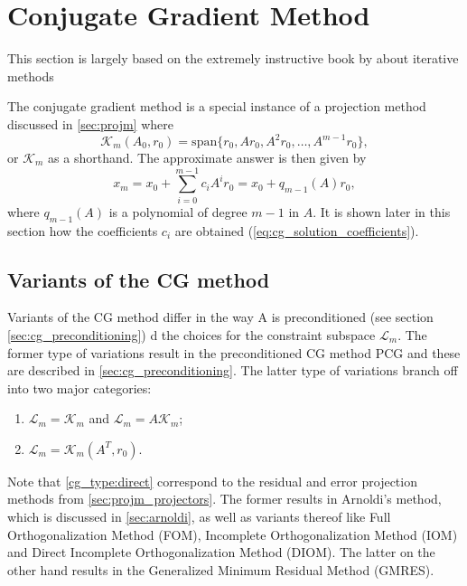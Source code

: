 \section{Conjugate Gradient Method}\label{sec:cg}
This section is largely based on the extremely instructive book by \citeauthor{iter_method_saad} about iterative methods \cite[Section 6: Krylov Subspace Methods Part I]{iter_method_saad}

The conjugate gradient method is a special instance of a projection method discussed in \cref{sec:projm} where
\begin{equation}
  \mathcal{K}_m(A_0, r_0) = \text{span}\{r_0, Ar_0, A^2r_0, \dots, A^{m-1}r_0\},
  \label{eq:cg_krylov_space}
\end{equation}
or $\mathcal{K}_m$ as a shorthand. The approximate answer is then given by
\begin{equation}
  x_m = x_0 + \sum_{i=0}^{m-1} c_i A^i r_0 = x_0 + q_{m-1}(A)r_0,
  \label{eq:cg_approximate_solution}
\end{equation}
where $q_{m-1}(A)$ is a polynomial of degree $m-1$ in $A$. It is shown later in this section how the coefficients $c_i$ are obtained (\cref{eq:cg_solution_coefficients}).

\subsection{Variants of the CG method} \label{sec:cg_variants}
Variants of the CG method differ in the way A is preconditioned (see section \cref{sec:cg_preconditioning}) d the choices for the constraint subspace $\mathcal{L}_m$. The former type of variations result in the preconditioned CG method PCG and these are described in \cref{sec:cg_preconditioning}. The latter type of variations branch off into two major categories:
\begin{enumerate}[label=\roman*,ref=CG-type \roman*]
  \item\label{cg_type:direct} $\mathcal{L}_m = \mathcal{K}_m$ and $\mathcal{L}_m = A\mathcal{K}_m$;
  \item\label{cg_type:transpose}$\mathcal{L}_m = \mathcal{K}_m(A^T,r_0)$.
\end{enumerate}
Note that \cref{cg_type:direct} correspond to the residual and error projection methods from \cref{sec:projm_projectors}. The former results in Arnoldi's method, which is discussed in \cref{sec:arnoldi}, as well as variants thereof like Full Orthogonalization Method (FOM), Incomplete Orthogonalization Method (IOM) and Direct Incomplete Orthogonalization Method (DIOM). The latter on the other hand results in the Generalized Minimum Residual Method (GMRES).

